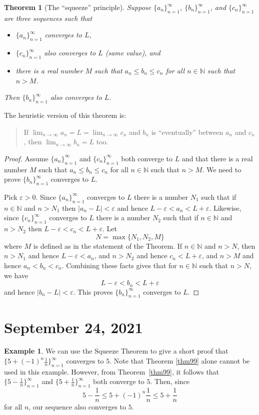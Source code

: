 \documentclass[12pt]{amsart}
\def\e{\varepsilon}
\newcommand{\N}{\mathbb{N}}
\numberwithin{equation}{section}
\theoremstyle{plain} %
\newtheorem{thm}[equation]{Theorem}
\newcommand{\Sept}[1]{\section{September #1, 2021}}
\theoremstyle{definition}
\newtheorem{ex}[equation]{Example}
\theoremstyle{remark}
\begin{document}
\begin{thm}[The ``squeeze'' principle] \label{thm33}
Suppose 
$\{a_n\}_{n=1}^\infty$, $\{b_n\}_{n=1}^\infty$, and $\{c_n\}_{n=1}^\infty$ are three sequences such that 
\begin{itemize}
\item $\{a_n\}_{n=1}^\infty$ converges to $L$, 
\item $\{c_n\}_{n=1}^\infty$ also converges to $L$ (same value), and
\item there is a real number $M$ such that $a_n \leq b_n \leq c_n$ for all $n \in \N$ such that $n > M$. 
\end{itemize}
Then $\{b_n\}_{n=1}^\infty$ also converges to $L$.
\end{thm}

The heuristic version of this theorem is:
\begin{quote}
If $\lim_{n \to \infty} a_n = L = \lim_{n \to \infty} c_n$ and $b_n$ is ``eventually'' between $a_n$ and $c_n$, then
$\lim_{n \to \infty} b_n = L$ too.
\end{quote}
 



\begin{proof}
Assume $\{a_n\}_{n=1}^\infty$ and  $\{c_n\}_{n=1}^\infty$ both
converge to $L$ and that there is a real number $M$ such that $a_n \leq b_n \leq c_n$ for all $n \in \N$ such that $n > M$. 
We need to prove $\{b_n\}_{n=1}^\infty$ converges to $L$.

Pick $\e> 0$.  Since  $\{a_n\}_{n=1}^\infty$ converges to $L$ there is a number $N_1$ such that if $n \in \N$ and $n > N_1$ then
$|a_n - L| < \e$ and hence $L- \e < a_n < L + \e$. Likewise, 
since $\{c_n\}_{n=1}^\infty$ converges to $L$ there is a number $N_2$ such that if $n \in \N$ and $n > N_2$ then
 $L- \e < c_n < L + \e$. Let 
$$
N = \max\{N_1, N_2, M\}
$$
where $M$ is defined as in the statement of the Theorem. If $n \in \N$ and $n > N$, then
$n > N_1$ and hence $L - \e < a_n$, and $n > N_2$ and hence $c_n < L + \e$, and $n > M$ and hence
$a_n < b_n < c_n$. Combining these facts gives that for $n \in \N$ such that $n > N$,
we have
$$
L - \e < b_n < L + \e
$$
and hence $|b_n - L| < \e$.
This proves $\{b_n\}_{n=1}^\infty$ converges to $L$. 
\end{proof}


\Sept{24}

\begin{ex} We can use the Squeeze Theorem to give a short proof that $\{ 5 + (-1)^n \frac{1}{n} \}_{n=1}^\infty$ converges to $5$. Note that Theorem \ref{thm99} alone cannot be used in this
  example. However, from Theorem~\ref{thm99}, it follows that $\{5-\frac{1}{n}\}_{n=1}^\infty$ and  $\{5+\frac{1}{n}\}_{n=1}^\infty$ both converge to $5$. Then, since \[5-\frac{1}{n} \leq  5 + (-1)^n \frac{1}{n} \leq 5+\frac{1}{n}\] for all $n$, our sequence also converges to $5$.\end{ex}
\end{document}
